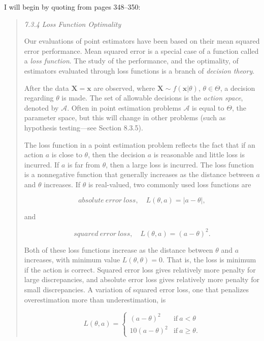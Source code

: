 \documentclass[english]{article}
\begin{document}
I will begin by quoting from pages 348--350:
\begin{quote}
\textit{7.3.4 Loss Function Optimality}

Our evaluations of point estimators have been based on their mean
squared error performance. Mean squared error is a special case of
a function called a \textit{loss function}. The study of the performance,
and the optimality, of estimators evaluated through loss functions
is a branch of \textit{decision theory}.

After the data $\mathbf{X}=\mathbf{x}$ are observed, where $\mathbf{X}\sim f(\mathbf{x}|\theta)$,
$\theta\in\Theta$, a decision regarding $\theta$ is made. The set
of allowable decisions is the \textit{action space}, denoted by $\mathcal{A}$.
Often in point estimation problems $\mathcal{A}$ is equal to $\Theta$,
the parameter space, but this will change in other problems (such
as hypothesis testing---see Section 8.3.5).

The loss function in a point estimation problem reflects the fact
that if an action $a$ is close to $\theta$, then the decision $a$
is reasonable and little loss is incurred. If $a$ is far from $\theta$,
then a large loss is incurred. The loss function is a nonnegative
function that generally increases as the distance between $a$ and
$\theta$ increases. If $\theta$ is real-valued, two commonly used
loss functions are

\[
{\textstyle absolute\:error\:loss},\quad L(\theta,a)=|a-\theta|,
\]

and

\[
{\textstyle squared\:error\:loss},\quad L(\theta,a)=(a-\theta)^{2}.
\]

Both of these loss functions increase as the distance between $\theta$
and $a$ increases, with minimum value $L(\theta,\theta)=0$. That
is, the loss is minimum if the action is correct. Squared error loss
gives relatively more penalty for large discrepancies, and absolute
error loss gives relatively more penalty for small discrepancies.
A variation of squared error loss, one that penalizes overestimation
more than underestimation, is

\begin{equation}
L(\theta,a)=\begin{cases}
(a-\theta)^{2} & \mathrm{if}\:a<\theta\\
10(a-\theta)^{2} & \mathrm{if}\:a\geq\theta.
\end{cases}\label{eq:variation-sq-error-loss}
\end{equation}


\end{quote}
\end{document}

